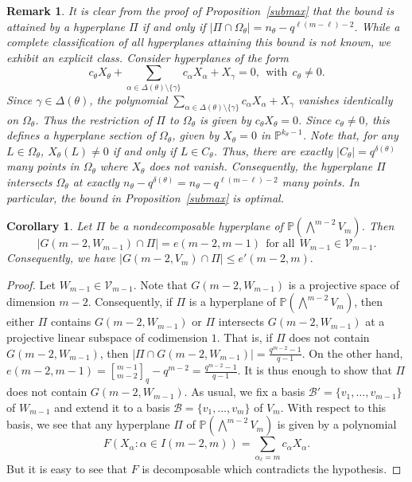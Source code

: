 \documentclass[10pt,a4paper,oneside]{amsproc}
\newtheorem{corollary}[theorem]{Corollary}
\newtheorem{remark}[theorem]{Remark}
\newcommand{\B}{\mathcal{B}}
\def\a{{\alpha}}
\def\PP{{\mathbb P}}
\newcommand{\V}{{\mathcal{V}}}
\begin{document}
 
\begin{remark}\label{rem:attained}\normalfont
It is clear from the proof of Proposition~\ref{submax} that 
the bound is attained by a hyperplane $\Pi$ if and only if 
$|\Pi \cap \Omega_\theta| = n_\theta - q^{\ell(m-\ell)-2}$.
While a complete classification of all hyperplanes attaining 
this bound is not known, we exhibit an explicit class. Consider 
hyperplanes of the form 
$$c_\theta X_\theta + \sum_{\a \in \Delta(\theta) \setminus 
\{\gamma\}} c_\a X_\a + X_\gamma = 0, \ \ \text{with} \ \ 
c_\theta \neq 0.$$
Since $\gamma \in \Delta(\theta)$, the polynomial 
$\sum_{\a \in \Delta(\theta) \setminus \{\gamma\}} c_\a X_\a 
+ X_\gamma$ vanishes identically on $\Omega_\theta$. Thus the 
restriction of $\Pi$ to $\Omega_\theta$ is given by 
$c_\theta X_\theta = 0$. Since $c_\theta \neq 0$, this defines 
a hyperplane section of $\Omega_\theta$, given by $X_\theta = 0$ 
in $\PP^{k_\theta - 1}$. Note that, for any $L \in \Omega_\theta$, 
$X_{\theta} (L) \neq 0$ if and only if $L \in C_{\theta}$. Thus, 
there are exactly $|C_\theta| = q^{\delta(\theta)}$ many points 
in $\Omega_\theta$ where $X_\theta$ does not vanish. 
Consequently, the hyperplane $\Pi$ intersects $\Omega_\theta$ 
at exactly $n_\theta - q^{\delta(\theta)} = n_\theta - 
q^{\ell(m-\ell)-2}$ many points. In particular, the bound in 
Proposition~\ref{submax} is optimal.
\end{remark}




\begin{corollary}\label{cor}
Let $\Pi$ be a nondecomposable hyperplane of $\PP\left(\bigwedge^{m-2} V_m\right)$. Then $$|G(m - 2, W_{m-1}) \cap \Pi|= e(m-2, m-1) \ \ \text{for all} \ \   W_{m-1} \in \V_{m-1}.$$ Consequently, we have $|G(m-2, V_m) \cap \Pi| \le e'(m-2, m).$
\end{corollary}

\begin{proof}
   Let $W_{m-1} \in \V_{m-1}$. Note that $G(m-2, W_{m-1})$ is a projective space of dimension $m-2$. Consequently, if $\Pi$ is a hyperplane of $\PP \left(\bigwedge^{m-2} V_m \right)$, then either $\Pi$ contains $G(m-2, W_{m-1})$ or $\Pi$ intersects $G(m-2, W_{m-1})$ at a projective linear subspace of codimension $1$. That is, if $\Pi$ does not contain $G(m-2, W_{m-1})$, then $|\Pi \cap G(m-2, W_{m-1})| = \frac{q^{m-2} - 1}{q-1}$. On the other hand, $e (m-2, m-1) = {m-1 \brack m-2}_q - q^{m-2} = \frac{q^{m-2} - 1}{q-1}$. It is thus enough to show that $\Pi$ does not contain $G(m-2, W_{m-1})$. As usual, we fix a basis $\B' =\{v_1, \dots, v_{m-1}\}$ of $W_{m-1}$ and extend it to a basis $\B = \{v_1, \dots, v_m\}$ of $V_m$. With respect to this basis, we see that any hyperplane $\Pi$ of $\PP \left(\bigwedge^{m-2} V_m \right)$ is given by a polynomial 
   $$F (X_\a : \a \in I(m-2, m)) = \sum_{\a_\ell = m}{c_\a X_\a}.$$
   But it is easy to see that $F$ is decomposable which contradicts the hypothesis. 
\end{proof}
\end{document}
